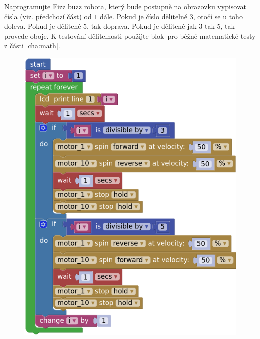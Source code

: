 \documentclass[../main.tex]{subfiles}
\begin{document}
	\begin{question*}
		Naprogramujte \href{https://en.wikipedia.org/wiki/Fizz\_buzz}{Fizz buzz} robota, který bude postupně na obrazovku vypisovat čísla (viz. předchozí část) od $1$ dále. Pokud je číslo dělitelné $3$, otočí se u toho doleva. Pokud je dělitené $5$, tak doprava. Pokud je dělitené jak $3$ tak $5$, tak provede oboje. K testování dělitelnosti použijte blok~pro běžné matematické testy z části \ref{cha:math}.
	\end{question*}

	\begin{solution}
		\begin{figure}
			\centering
			\begin{minipage}{0.5\textwidth}
				\includegraphics[width=\linewidth]{Images/05/solfb.png}
			\end{minipage}
		\end{figure}
	\end{solution}
\end{document}
